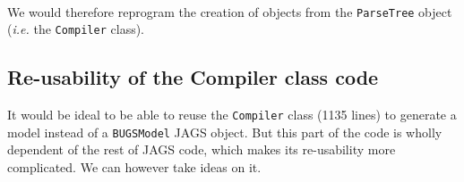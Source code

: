 \paragraph{}
We would therefore reprogram the creation of \biips{} objects from the \texttt{ParseTree} object (\textit{i.e.} the \texttt{Compiler} class).


\subsection{Re-usability of the Compiler class code}
It would be ideal to be able to reuse the \texttt{Compiler} class (1135 lines) to generate a \biips{} model instead of a \texttt{BUGSModel} JAGS object. But this part of the code is wholly dependent of the rest of JAGS code, which makes its re-usability more complicated. We can however take ideas on it.

